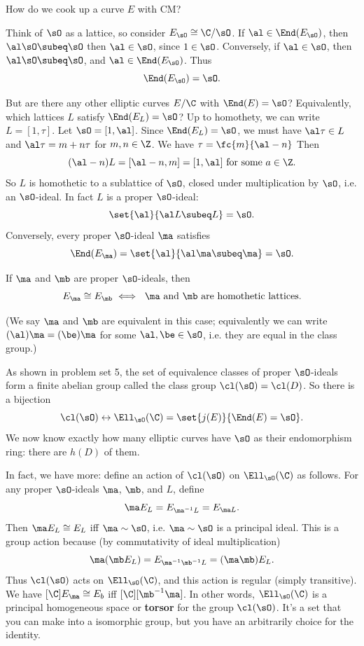 How do we cook up a curve $E$ with CM?

Think of $\sO$ as a lattice, so consider $E_{\sO}\cong \C/\sO$. If $\al\in \End(E_{\sO})$, then $\al\sO\subeq \sO$ then $\al\in\sO$, since $1\in \sO$. Conversely, if $\al\in \sO$, then $\al\sO\subeq \sO$, and $\al\in \End(E_{\sO})$. Thus
\[
\End(E_{\sO})=\sO.
\]

But are there any other elliptic curves $E/\C$ with $\End(E)=\sO$? Equivalently, which lattices $L$ satisfy $\End(E_L)=\sO$? Up to homothety, we can write $L=[1,\tau]$. Let $\sO=[1,\al]$. Since $\End(E_L)=\sO$, we must have $\al \tau\in L$ and $\al\tau=m+n\tau$ for $m,n\in \Z$. We have $\tau=\fc{m}{\al-n}$ %
Then
\[
(\al-n)L=[\al-n,m]=[1,\al]\text{ for some }a\in \Z.
\]
So $L$ is homothetic to a sublattice of $\sO$, closed under multiplication by $\sO$, i.e. an $\sO$-ideal. In fact $L$ is a proper $\sO$-ideal:
\[%
\set{\al}{\al L\subeq L}=\sO.
\]
Conversely, every proper $\sO$-ideal $\ma$ satisfies
\[
\End(E_{\ma})=\set{\al}{\al\ma\subeq \ma}=\sO.
\]
\begin{pr}
If $\ma$ and $\mb$ are proper $\sO$-ideals, then
\[
E_{\ma}\cong E_{\mb}\iff \text{ $\ma$ and $\mb$ are homothetic lattices.}
\]
\end{pr}
(We say $\ma$ and $\mb$ are equivalent in this case; equivalently we can write $(\al)\ma=(\be)\ma$ for some $\al,\be\in \sO$, i.e. they are equal in the class group.) %

As shown in problem set 5, the set of equivalence classes of proper $\sO$-ideals form a finite abelian group called the class group %
$\cl(\sO)=\cl(D)$. So there is a bijection
\[
\cl(\sO)\leftrightarrow \Ell_{\sO}(\C)=\set{j(E)}{\End(E)=\sO}.
\]
We now know exactly how many elliptic curves have $\sO$ as their endomorphism ring: there are $h(D)$ of them.

In fact, we have more: define an action of $\cl(\sO)$ on $\Ell_{\sO}(\C)$ as follows. 
For any proper $\sO$-ideals $\ma$, $\mb$, and $L$, define
\[
\ma E_L=E_{\ma^{-1}L}=E_{\ma L}.
\]
Then $\ma E_L\cong E_L$ iff $\ma\sim \sO$, i.e. $\ma\sim \sO$ is a principal ideal. This is a group action because (by commutativity of ideal multiplication)
\[
\ma(\mb E_L)=E_{\ma^{-1}\mb^{-1}L}=(\ma\mb)E_L.
\]
Thus $\cl(\sO)$ acts on $\Ell_{\sO}(\C)$, and this action is regular (simply transitive). We have $[\C] E_{\ma}\cong E_b$ iff $[\C][\mb^{-1}\ma]$. In other words, $\Ell_{\sO}(\C)$ is a principal homogeneous space or \textbf{torsor} for the group $\cl(\sO)$. It's a set that you can make into a isomorphic group, but you have an arbitrarily choice for the identity. 

